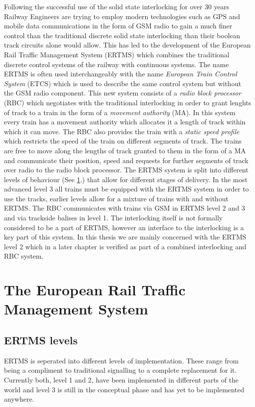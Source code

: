 \label{chapter:ERTMS}

Following the successful use of the solid state interlocking for over 30 years Railway Engineers are trying to employ modern technologies such as GPS and mobile data communications in the form of GSM radio to gain a much finer control than the traditional discrete solid state interlocking than their boolean track circuits alone would allow. This has led to the development of the European Rail Traffic Management System (ERTMS) which combines the traditional discrete control systems of the railway with continuous systems. The name ERTMS is often used interchangeably with the name \emph{European Train Control System} (ETCS) which is used to describe the same control system but without the GSM radio component. This new system consists of a \emph{radio block processor} (RBC) which negotiates with the traditional interlocking in order to grant lenghts of track to a train in the form of a \emph{movement authority} (MA). In this system every train has a movement authority which allocates it a length of track within which it can move. The RBC also provides the train with a \emph{static speed profile} which restricts the speed of the train on different segments of track. The trains are free to move along the lengths of track granted to them in the form of a MA and communicate their position, speed and requests for further segments of track over radio to the radio block processor. The ERTMS system is split into different levels of behaviour (See \ref{sec:theertms}.) that allow for different stages of delivery. In the most advanced level 3 all trains must be equipped with the ERTMS system in order to use the tracks, earlier levels allow for a mixture of trains with and without ERTMS. The RBC communicates with trains via GSM in ERTMS level 2 and 3 and via trackside balises in level 1. The interlocking itself is not formally considered to be a part of ERTMS, however an interface to the interlocking is a key part of this system. In this thesis we are mainly concerned with the ERTMS level 2 which in a later chapter is verified as part of a combined interlocking and RBC system.


\section{The European Rail Traffic Management System}
\label{sec:theertms}
\subsection*{ERTMS levels}
ERTMS is seperated into different levels of implementation. These range from being a compliment to traditional signalling to a complete replacement for it. Currently both, level 1 and 2, have been implemented in different parts of the world and level 3 is still in the conceptual phase and has yet to be implemented anywhere.

